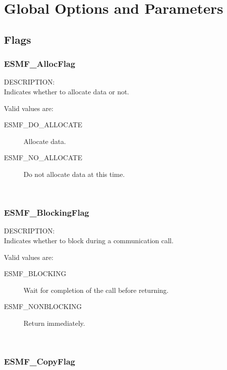 
\section{Global Options and Parameters}

\subsection{Flags}

\subsubsection{ESMF\_AllocFlag}

{\sf DESCRIPTION:\\}  
Indicates whether to allocate data or not.

Valid values are:
\begin{description}
\item [ESMF\_DO\_ALLOCATE]
      Allocate data. 
\item [ESMF\_NO\_ALLOCATE]
      Do not allocate data at this time. 
\end{description}

\mbox{}\hrulefill\

\subsubsection{ESMF\_BlockingFlag}

{\sf DESCRIPTION:\\}  
Indicates whether to block during a communication call.

Valid values are:
\begin{description}

\item [ESMF\_BLOCKING]
      Wait for completion of the call before returning. 
\item [ESMF\_NONBLOCKING]
      Return immediately. 
\end{description}

\mbox{}\hrulefill\


\subsubsection{ESMF\_CopyFlag}

